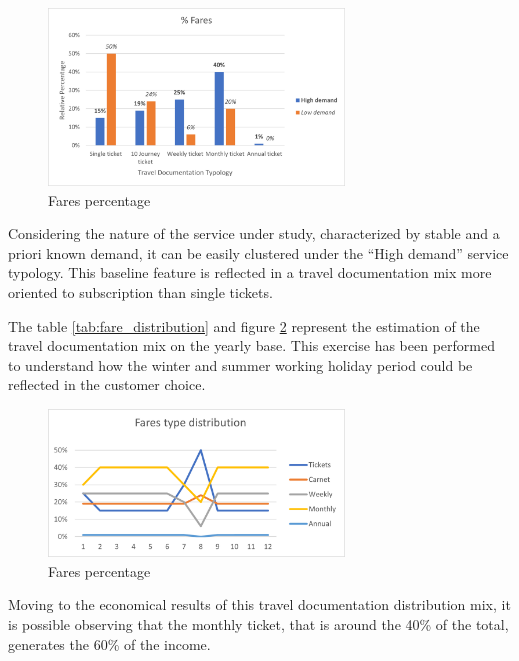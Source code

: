 \begin{figure}[h]
    \centering
    \includegraphics[width=0.7\textwidth]{Images/financial/fares.png}
    \caption{Fares percentage}
    \label{fig:fares_percentage}
\end{figure}
Considering the nature of the service under study, characterized by stable and a priori known demand, it can be easily clustered under the “High demand” service typology. This baseline feature is reflected in a travel documentation mix more oriented to subscription than single tickets.

The table \ref{tab:fare_distribution} and figure \ref{fig:fares_percentage2} represent the estimation of the travel documentation mix on the yearly base. This exercise has been performed to understand how the winter and summer working holiday period could be reflected in the customer choice.
\begin{figure}[h]
    \centering
    \includegraphics[width=0.7\textwidth]{Images/financial/fares_type_distribution.png}
    \caption{Fares percentage}
    \label{fig:fares_percentage2}
\end{figure}


Moving to the economical results of this travel documentation distribution mix, it is possible observing that the monthly ticket, that is around the 40\% of the total, generates the 60\% of the income.

